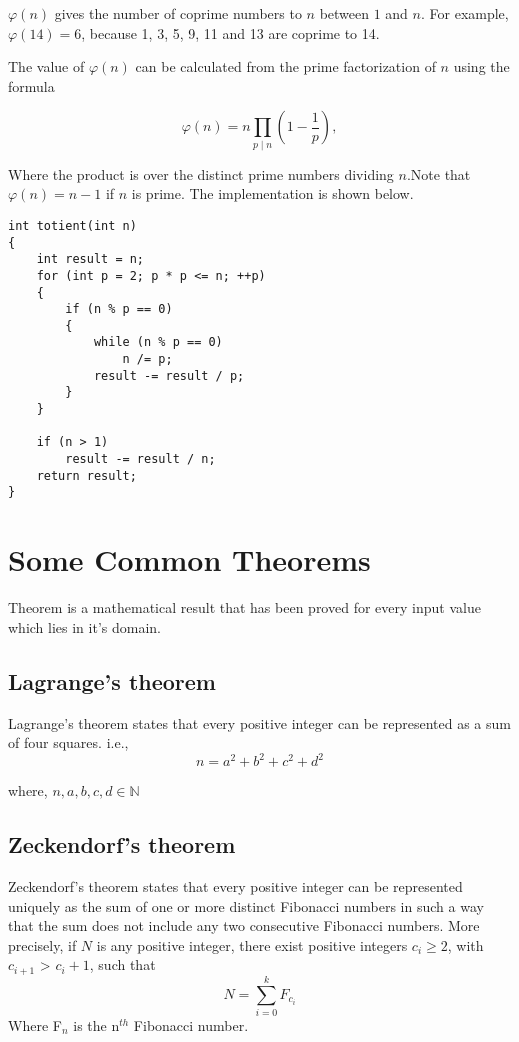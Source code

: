 \documentclass[twoside,12pt,a4paper,english]{book}
\theoremstyle{definition}
\theoremstyle{problemstyle}
\begin{document}
 $\varphi(n)$
gives the number of coprime numbers to $n$
between $1$ and $n$.
For example, $\varphi(14)=6$,
because 1, 3, 5, 9, 11 and 13
are coprime to 14.

The value of $\varphi(n)$ can be calculated
from the prime factorization of $n$
using the formula

\begin{equation}
\varphi (n)=n\prod _{p\mid n}\left(1-{\frac {1}{p}}\right),
\end{equation}

Where the product is over the distinct prime numbers dividing $n$.Note that $\varphi(n)=n-1$ if $n$ is prime. The implementation is shown below.
\begin{lstlisting}
int totient(int n) 
{ 
	int result = n;
	for (int p = 2; p * p <= n; ++p) 
	{ 
		if (n % p == 0) 
		{ 
			while (n % p == 0) 
				n /= p; 
			result -= result / p; 
		} 
	} 
	
	if (n > 1) 
		result -= result / n; 
	return result; 
} 
\end{lstlisting}

\section{Some Common Theorems}
Theorem is a mathematical result that has been proved for every input value which lies in it's domain.

\subsection{Lagrange’s theorem}
Lagrange’s theorem states that every positive integer can be represented as a
sum of four squares. i.e.,
$$n = a^2 + b^2 + c^2 + d^2$$

where, $n,a,b,c,d \in \mathbb{N}$
\subsection{Zeckendorf's theorem}
Zeckendorf's theorem states that every positive integer can be represented uniquely as the sum of one or more distinct Fibonacci numbers in such a way that the sum does not include any two consecutive Fibonacci numbers. More precisely, if $N$ is any positive integer, there exist positive integers $c_i \geq 2$, with $c_{i+1}$ > $c_i + 1$, such that
\begin{equation}
N=\sum _{{i=0}}^{k}F_{{c_{i}}}
\end{equation}
Where F$_{n}$ is the n$^{th}$ Fibonacci number.
\end{document}
